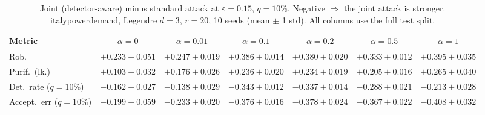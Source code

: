 \begin{table}[htbp]
  \centering
  \small
  \begin{tabular}{@{}lcccccc@{}}
    \toprule
    Metric & $\alpha{=}0$ & $\alpha{=}0.01$ & $\alpha{=}0.1$ & $\alpha{=}0.2$ & $\alpha{=}0.5$ & $\alpha{=}1$ \\
    \midrule
    Rob. & $+0.233 \pm 0.051$ & $+0.247 \pm 0.019$ & $+0.386 \pm 0.014$ & $+0.380 \pm 0.020$ & $+0.333 \pm 0.012$ & $+0.395 \pm 0.035$ \\
    Purif.\ (lk.) & $+0.103 \pm 0.032$ & $+0.176 \pm 0.026$ & $+0.236 \pm 0.020$ & $+0.234 \pm 0.019$ & $+0.205 \pm 0.016$ & $+0.265 \pm 0.040$ \\
    Det.\ rate ($q{=}10\%$) & $-0.162 \pm 0.027$ & $-0.138 \pm 0.029$ & $-0.343 \pm 0.012$ & $-0.337 \pm 0.014$ & $-0.288 \pm 0.021$ & $-0.213 \pm 0.028$ \\
    Accept.\ err ($q{=}10\%$) & $-0.199 \pm 0.059$ & $-0.233 \pm 0.020$ & $-0.376 \pm 0.016$ & $-0.378 \pm 0.024$ & $-0.367 \pm 0.022$ & $-0.408 \pm 0.032$ \\
    \bottomrule
  \end{tabular}
  \caption{Joint (detector-aware) minus standard attack at $\varepsilon=0.15$, $q{=}10\%$. Negative $\Rightarrow$ the joint attack is stronger. italypowerdemand, Legendre $d{=}3$, $r{=}20$, 10 seeds (mean $\pm$ 1 std). All columns use the full test split.}
  \label{tab:italypowerdemand_joint_r20_eps0.15}
\end{table}
